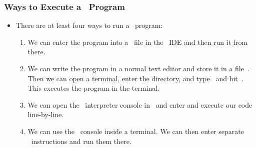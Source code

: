 \documentclass[aspectratio=169,mathserif,notheorems]{beamer}%
\begin{document}
%
\begin{frame}[fragile]
\frametitle{Ways to Execute a \python\ Program}%
\begin{itemize}%
%
\item There are at least four ways to run a \python\ program:%
\begin{enumerate}%
\item We can enter the program into a \python\ file in the \pycharm\ IDE and then run it from there.%
\item We can write the program in a normal text editor and store it in a file~. %
Then we can open a terminal, enter the directory, and type~ and hit~\keys{\enter}. %
This executes the program in the terminal.%
%
\item We can open the \python\ interpreter console in \pycharm\ and enter and execute our code line-by-line.%
%
\item We can use the \python\ console inside a terminal. %
We can then enter separate \python\ instructions and run them there.%
\end{enumerate}%
%
%
\end{itemize}%
\end{frame}
%
%
\end{document}

